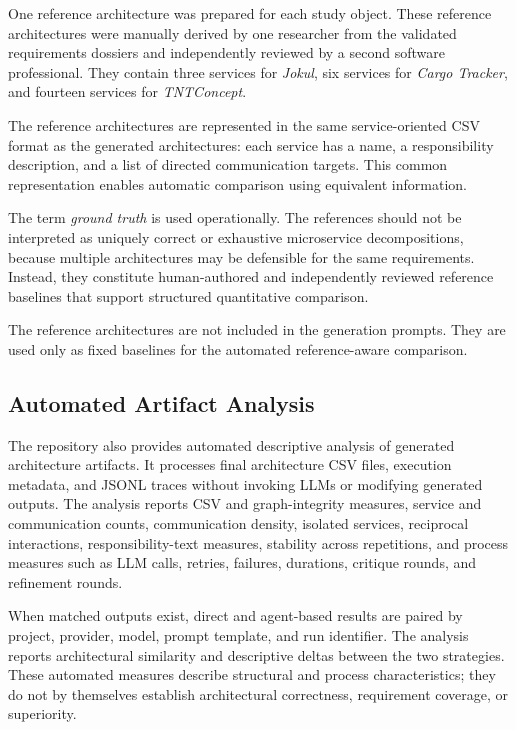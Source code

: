 \documentclass[acmsmall,screen,anonymous,review]{acmart}
\begin{document}
One reference architecture was prepared for each study object. These reference architectures were manually derived by one researcher from the validated requirements dossiers and independently reviewed by a second software professional. They contain three services for \textit{Jokul}, six services for \textit{Cargo Tracker}, and fourteen services for \textit{TNTConcept}.

The reference architectures are represented in the same service-oriented CSV format as the generated architectures: each service has a name, a responsibility description, and a list of directed communication targets. This common representation enables automatic comparison using equivalent information.

The term \emph{ground truth} is used operationally. The references should not be interpreted as uniquely correct or exhaustive microservice decompositions, because multiple architectures may be defensible for the same requirements. Instead, they constitute human-authored and independently reviewed reference baselines that support structured quantitative comparison.

The reference architectures are not included in the generation prompts. They are used only as fixed baselines for the automated reference-aware comparison.

\subsection{Automated Artifact Analysis}

The repository also provides automated descriptive analysis of generated architecture artifacts. It processes final architecture CSV files, execution metadata, and JSONL traces without invoking LLMs or modifying generated outputs. The analysis reports CSV and graph-integrity measures, service and communication counts, communication density, isolated services, reciprocal interactions, responsibility-text measures, stability across repetitions, and process measures such as LLM calls, retries, failures, durations, critique rounds, and refinement rounds.

When matched outputs exist, direct and agent-based results are paired by project, provider, model, prompt template, and run identifier. The analysis reports architectural similarity and descriptive deltas between the two strategies. These automated measures describe structural and process characteristics; they do not by themselves establish architectural correctness, requirement coverage, or superiority.
\end{document}
